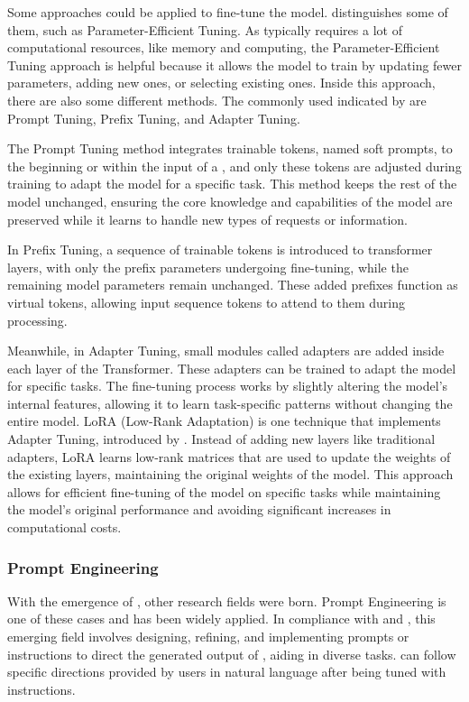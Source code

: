 Some approaches could be applied to fine-tune the model. \citet{naveed_comprehensive_2023} distinguishes some of them, such as Parameter-Efficient Tuning. As {\llm} typically requires a lot of computational resources, like memory and computing, the Parameter-Efficient Tuning approach is helpful because it allows the model to train by updating fewer parameters, adding new ones, or selecting existing ones. Inside this approach, there are also some different methods. The commonly used indicated by \citet{naveed_comprehensive_2023} are Prompt Tuning, Prefix Tuning, and Adapter Tuning.

The Prompt Tuning method integrates trainable tokens, named soft prompts, to the beginning or within the input of a {\llm}, and only these tokens are adjusted during training to adapt the model for a specific task. This method keeps the rest of the model unchanged, ensuring the core knowledge and capabilities of the model are preserved while it learns to handle new types of requests or information.

In Prefix Tuning, a sequence of trainable tokens is introduced to transformer layers, with only the prefix parameters undergoing fine-tuning, while the remaining model parameters remain unchanged. These added prefixes function as virtual tokens, allowing input sequence tokens to attend to them during processing.

Meanwhile, in Adapter Tuning, small modules called adapters are added inside each layer of the Transformer. These adapters can be trained to adapt the model for specific tasks. The fine-tuning process works by slightly altering the model's internal features, allowing it to learn task-specific patterns without changing the entire model. LoRA (Low-Rank Adaptation) is one technique that implements Adapter Tuning, introduced by \citet{hu_lora_2021}. Instead of adding new layers like traditional adapters, LoRA learns low-rank matrices that are used to update the weights of the existing layers, maintaining the original weights of the model. This approach allows for efficient fine-tuning of the model on specific tasks while maintaining the model's original performance and avoiding significant increases in computational costs.


\subsubsection{Prompt Engineering}

With the emergence of {\llm}, other research fields were born. Prompt Engineering is one of these cases and has been widely applied. In compliance with \citet{mesko_prompt_2023} and \citet{ma_beyond_2023}, this emerging field involves designing, refining, and implementing prompts or instructions to direct the generated output of {\llm}, aiding in diverse tasks. {\llm} can follow specific directions provided by users in natural language after being tuned with instructions.

